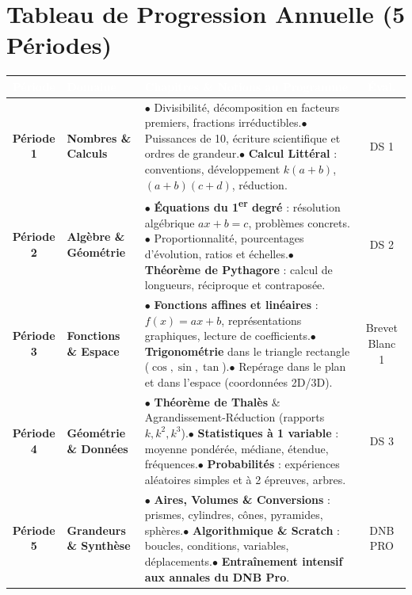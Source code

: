 \vspace{0.8cm}

\section*{Tableau de Progression Annuelle (5 Périodes)}

\noindent
\begin{tabularx}{\linewidth}{|c|l|X|c|}
\hline
\rowcolor{colPrimary} \textcolor{white}{\textbf{Période}} & \textcolor{white}{\textbf{Domaine}} & \textcolor{white}{\textbf{Chapitres \& Notions au Programme}} & \textcolor{white}{\textbf{Éval.}} \\
\hline
\rowcolor{colDefBg} \textbf{Période 1} & \textbf{Nombres \& Calculs} & $\bullet$ Divisibilité, décomposition en facteurs premiers, fractions irréductibles.\newline $\bullet$ Puissances de 10, écriture scientifique et ordres de grandeur.\newline $\bullet$ \textbf{Calcul Littéral} : conventions, développement $k(a+b)$, $(a+b)(c+d)$, réduction. & DS 1 \\
\hline
\rowcolor{white} \textbf{Période 2} & \textbf{Algèbre \& Géométrie} & $\bullet$ \textbf{Équations du 1\textsuperscript{er} degré} : résolution algébrique $ax+b=c$, problèmes concrets.\newline $\bullet$ Proportionnalité, pourcentages d'évolution, ratios et échelles.\newline $\bullet$ \textbf{Théorème de Pythagore} : calcul de longueurs, réciproque et contraposée. & DS 2 \\
\hline
\rowcolor{colDefBg} \textbf{Période 3} & \textbf{Fonctions \& Espace} & $\bullet$ \textbf{Fonctions affines et linéaires} : $f(x)=ax+b$, représentations graphiques, lecture de coefficients.\newline $\bullet$ \textbf{Trigonométrie} dans le triangle rectangle ($\cos, \sin, \tan$).\newline $\bullet$ Repérage dans le plan et dans l'espace (coordonnées 2D/3D). & Brevet Blanc 1 \\
\hline
\rowcolor{white} \textbf{Période 4} & \textbf{Géométrie \& Données} & $\bullet$ \textbf{Théorème de Thalès} \& Agrandissement-Réduction (rapports $k, k^2, k^3$).\newline $\bullet$ \textbf{Statistiques à 1 variable} : moyenne pondérée, médiane, étendue, fréquences.\newline $\bullet$ \textbf{Probabilités} : expériences aléatoires simples et à 2 épreuves, arbres. & DS 3 \\
\hline
\rowcolor{colDefBg} \textbf{Période 5} & \textbf{Grandeurs \& Synthèse} & $\bullet$ \textbf{Aires, Volumes \& Conversions} : prismes, cylindres, cônes, pyramides, sphères.\newline $\bullet$ \textbf{Algorithmique \& Scratch} : boucles, conditions, variables, déplacements.\newline $\bullet$ \textbf{Entraînement intensif aux annales du DNB Pro}. & DNB PRO \\
\hline
\end{tabularx}

\newpage
